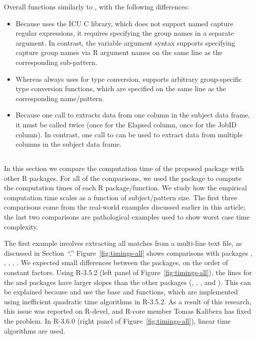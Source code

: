 Overall  functions
similarly to
, with the following
differences:
\begin{itemize}
\item Because  uses the ICU C library, which does
  not support named capture regular expressions, it requires
  specifying the group names in a separate argument. In contrast, the
   variable argument syntax supports specifying
  capture group names via R argument names on the same line as the
  corresponding sub-pattern.
\item Whereas  always uses
   for type conversion,
   supports arbitrary
  group-specific type conversion functions, which are specified on the
  same line as the corresponding name/pattern.
\item Because one call to  extracts data from one
  column in the subject data frame, it must be called twice (once for
  the Elapsed column, once for the JobID column). In contrast, one
  call to  can be used to
  extract data from multiple columns in the subject data frame. 
\end{itemize}

\subsection{\sectiontimings}
\label{sec:timings}

In this section we compare the computation time of the proposed
 package with other R packages. For all of the
comparisons, we used the  package to compute
the computation times of each R package/function. We study how the
empirical computation time scales as a function of subject/pattern size. The
first three comparisons come from the real-world examples discussed
earlier in this article; the last two comparisons are pathological examples
used to show worst case time complexity.

The first example involves extracting all matches from a multi-line
text file, as discussed in Section~``\sectiontrackDb.''
Figure~\ref{fig:timings-all} shows comparisons with packages
, , ,
, . We expected small differences
between the packages, on the order of constant factors. Using R-3.5.2
(left panel of Figure~\ref{fig:timings-all}), the lines for the
 and  packages have larger slopes than
the other packages
(, , , and ). This can be explained because  and  use the base  and  functions,
which are implemented using inefficient quadratic time algorithms in
R-3.5.2. As a result of this research, this issue was reported on
R-devel, and R-core member Tomas Kalibera has fixed the problem. In R-3.6.0 (right panel of Figure~\ref{fig:timings-all}), linear time algorithms are used. 

